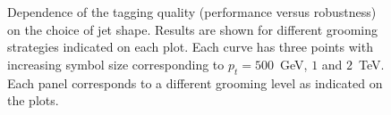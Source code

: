 \begin{figure}
  \caption{Dependence of the tagging quality (performance
    versus robustness) on the choice of jet shape.
    Results are shown for different grooming strategies indicated on
    each plot.
    Each curve has three points with increasing symbol size corresponding
    to $p_t=500$~GeV, $1$ and $2$~TeV.
    Each panel corresponds to a different grooming level as indicated on
    the plots.}\label{fig:lh2017-shape}
\end{figure}


\begin{figure}
  \centering
  \hfill%
  \\

\end{figure}
